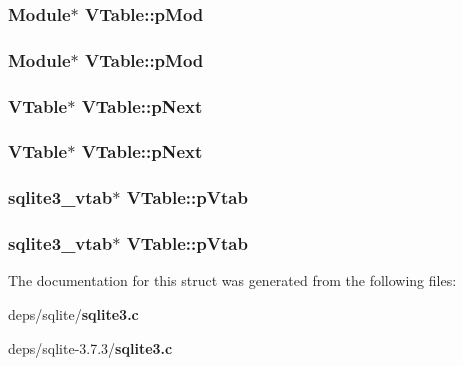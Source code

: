 \subsubsection{\setlength{\rightskip}{0pt plus 5cm}\bf{Module}$\ast$ \bf{VTable::p\-Mod}}\label{structVTable_a6f05e14afd44c1c5382ccc5ea16473d}


\subsubsection{\setlength{\rightskip}{0pt plus 5cm}\bf{Module}$\ast$ \bf{VTable::p\-Mod}}\label{structVTable_a6f05e14afd44c1c5382ccc5ea16473d}


\subsubsection{\setlength{\rightskip}{0pt plus 5cm}\bf{VTable}$\ast$ \bf{VTable::p\-Next}}\label{structVTable_2fbf787a47ca08313ca5a85e61ed47d6}


\subsubsection{\setlength{\rightskip}{0pt plus 5cm}\bf{VTable}$\ast$ \bf{VTable::p\-Next}}\label{structVTable_2fbf787a47ca08313ca5a85e61ed47d6}


\subsubsection{\setlength{\rightskip}{0pt plus 5cm}\bf{sqlite3\_\-vtab}$\ast$ \bf{VTable::p\-Vtab}}\label{structVTable_4f63690219976cd1222060936811da2a}


\subsubsection{\setlength{\rightskip}{0pt plus 5cm}\bf{sqlite3\_\-vtab}$\ast$ \bf{VTable::p\-Vtab}}\label{structVTable_4f63690219976cd1222060936811da2a}




The documentation for this struct was generated from the following files:\begin{CompactItemize}
\item 
deps/sqlite/\bf{sqlite3.c}\item 
deps/sqlite-3.7.3/\bf{sqlite3.c}\end{CompactItemize}
